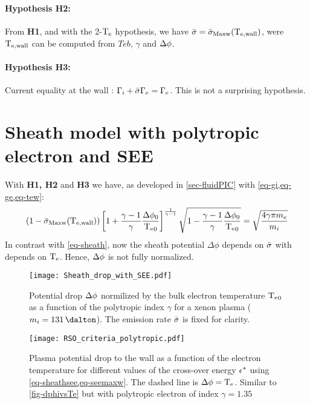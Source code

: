 \paragraph{Hypothesis H2: } From {\bf H1}, and with the 2-$\mathrm{T_e}$ hypothesis, we have $ \bar{\sigma } =  \bar{\sigma }_{\rm Maxw}(\mathrm{T_{e, wall}})$, were $\mathrm{T_{e, wall}}$ can be computed from $Teb$, $\gamma$ and $\Delta \phi$.

\paragraph{Hypothesis H3: } Current equality at the wall : $\Gamma_i +  \bar{\sigma } \Gamma_e = \Gamma_e$. This is not a surprising hypothesis.

\section{Sheath model with polytropic electron and SEE}

With {\bf H1, H2} and {\bf H3} we have, as developed in \cref{sec-fluidPIC} with \cref{eq-gi,eq-ge,eq-tew}:
\begin{equation}\label{eq-sheathsee}
  (1 -  \bar{\sigma }_{\rm Maxw}(\mathrm{T_{e, wall}}) )\left[ 1 +\frac{\gamma -1}{\gamma} \frac{ \Delta \phi_0}{ \mathrm{T_e}_0}  \right]^{\frac{1}{\gamma - 1}} \sqrt{1 - \frac{\gamma -1}{\gamma}\frac{\Delta \phi_0}{\mathrm{T_e}_0}} = \sqrt{\frac{4 \gamma \pi m_e}{m_i}}
\end{equation}
In contrast with \cref{eq-sheath}, now the sheath potential $\Delta \phi$ depends on $ \bar{\sigma }$ with depends on $\mathrm{T_e}$.
Hence, $\Delta \phi$ is not fully normalized.

\begin{figure}[hbtp]
  \centering
  \texttt{[image: Sheath\_drop\_with\_SEE.pdf]}
  \caption{Potential drop $\Delta \phi$ normilized by the bulk electron temperature $\mathrm{T_e}_0$ as a function of the polytropic index $\gamma$ for a xenon plasma ($m_i = 131\,\dalton$). The emission rate $ \bar{\sigma }$ is fixed for clarity.}
  \label{fig-dphi_see}
\end{figure}

\begin{figure}[hbtp]
  \centering
  \texttt{[image: RSO\_criteria\_polytropic.pdf]}
  \caption{ Plasma potential drop to the wall as a function of the electron temperature for different values of the cross-over energy $\epsilon^{*}$ using \cref{eq-sheathsee,eq-seemaxw}. The dashed line is $\Delta \phi=\mathrm{T_e}$. Similar to  \cref{fig-dphivsTe} but with polytropic electron of index $\gamma=1.35$}
  \label{fig-rso_crit_see}
\end{figure}

